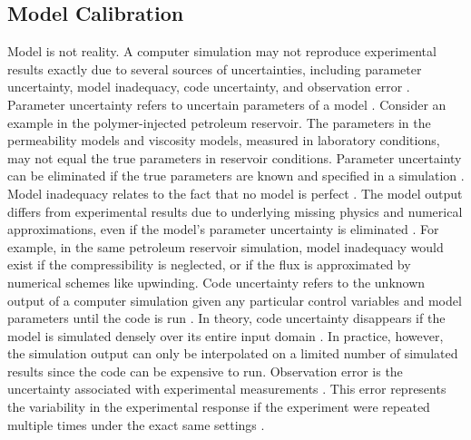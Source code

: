 \subsection{Model Calibration}
\label{sec: model calibration}
Model is not reality.
A computer simulation may not reproduce experimental results 
exactly due to several sources of uncertainties,
including parameter uncertainty, model inadequacy, code uncertainty,
and observation error \cite{KennedyOhagan2}.
Parameter uncertainty refers to uncertain parameters of a model \cite{KennedyOhagan2}.
Consider an example in the polymer-injected petroleum reservoir. The parameters in the permeability
models and viscosity models, measured in laboratory conditions, may not equal the
true parameters in reservoir conditions. Parameter uncertainty can be eliminated if 
the true parameters are known and specified in a simulation \cite{KennedyOhagan2}. 
Model inadequacy relates to the fact that no model is perfect \cite{KennedyOhagan2}.
The model output differs from experimental results due to underlying
missing physics and numerical approximations, even if the model's parameter uncertainty 
is eliminated \cite{KennedyOhagan2}. 
For example, in the same petroleum reservoir simulation, model inadequacy would 
exist if the compressibility is neglected, or if the flux is approximated by numerical schemes
like upwinding.  Code uncertainty refers to the unknown output of a computer simulation given any 
particular control variables and model parameters until the code is run \cite{KennedyOhagan2}. 
In theory, code uncertainty disappears if the model is simulated densely
over its entire input domain \cite{KennedyOhagan2}. 
In practice, however, the simulation output can only be interpolated
on a limited number of simulated results since the code can be expensive to run.
Observation error is the uncertainty associated with experimental
measurements \cite{KennedyOhagan2}. 
This error represents the variability in the experimental response if
the experiment were repeated multiple times under the exact same settings \cite{KennedyOhagan2}.\\

